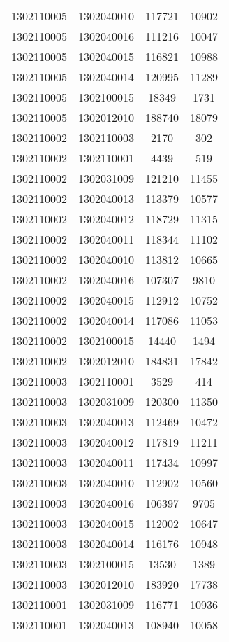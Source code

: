 \begin{longtable}[h]{llcc}
		1302110005 & 1302040010 & 117721 & 10902\\
		1302110005 & 1302040016 & 111216 & 10047\\
		1302110005 & 1302040015 & 116821 & 10988\\
		1302110005 & 1302040014 & 120995 & 11289\\
		1302110005 & 1302100015 & 18349 & 1731\\
		1302110005 & 1302012010 & 188740 & 18079\\
		1302110002 & 1302110003 & 2170 & 302\\
		1302110002 & 1302110001 & 4439 & 519\\
		1302110002 & 1302031009 & 121210 & 11455\\
		1302110002 & 1302040013 & 113379 & 10577\\
		1302110002 & 1302040012 & 118729 & 11315\\
		1302110002 & 1302040011 & 118344 & 11102\\
		1302110002 & 1302040010 & 113812 & 10665\\
		1302110002 & 1302040016 & 107307 & 9810\\
		1302110002 & 1302040015 & 112912 & 10752\\
		1302110002 & 1302040014 & 117086 & 11053\\
		1302110002 & 1302100015 & 14440 & 1494\\
		1302110002 & 1302012010 & 184831 & 17842\\
		1302110003 & 1302110001 & 3529 & 414\\
		1302110003 & 1302031009 & 120300 & 11350\\
		1302110003 & 1302040013 & 112469 & 10472\\
		1302110003 & 1302040012 & 117819 & 11211\\
		1302110003 & 1302040011 & 117434 & 10997\\
		1302110003 & 1302040010 & 112902 & 10560\\
		1302110003 & 1302040016 & 106397 & 9705\\
		1302110003 & 1302040015 & 112002 & 10647\\
		1302110003 & 1302040014 & 116176 & 10948\\
		1302110003 & 1302100015 & 13530 & 1389\\
		1302110003 & 1302012010 & 183920 & 17738\\
		1302110001 & 1302031009 & 116771 & 10936\\
		1302110001 & 1302040013 & 108940 & 10058\\

\end{longtable}
